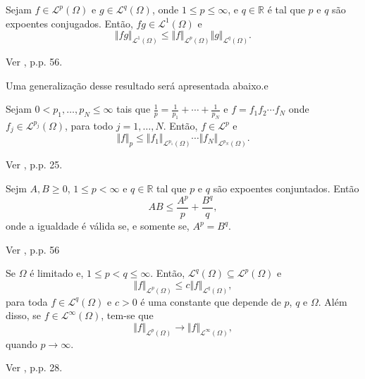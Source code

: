 \documentclass[a4paper, 11pt]{book}
\theoremstyle{definition}
\newcommand{\bR}{\mathbb{R}}
\newcommand{\cL}{\mathcal{L}}
\begin{document}

\begin{tbox} \label{thm:pre-desigualdade-de-holder}
    Sejam $f \in \cL^p(\Omega)$ e $g \in \cL^q(\Omega)$, onde $1 \leqslant p \leqslant \infty$, e $q \in \bR$ é tal que $p$ e $q$ são expoentes conjugados\footnotemark.
    Então, $fg \in \cL^1(\Omega)$ e
    \[
        \Vert fg \Vert_{\cL^1(\Omega)} \leqslant \Vert f \Vert_{\cL^p(\Omega)} \Vert g \Vert_{\cL^q(\Omega)}.
    \]
\end{tbox}
\begin{prf}
    Ver \cite{bartle-measure.theory}, p.p. 56.
\end{prf}


Uma generalização desse resultado será apresentada abaixo.e

\begin{tbox} \label{thm:pre-desigualdade-de-holder-gen}
    Sejam $0 < p_1,\dots,p_N \leqslant \infty$ tais que $\frac{1}{p} = \frac{1}{p_1} + \cdots + \frac{1}{p_N}$ e $f = f_1 f_2 \cdots f_N$ onde $f_j \in \cL^{p_j}(\Omega)$, para todo $j = 1,\dots,N$. 
    Então, $f \in \cL^p$ e 
    \[
        \Vert f \Vert_p \leqslant \Vert f_1 \Vert_{\cL^{p_1}(\Omega)} \cdots \Vert f_N \Vert_{\cL^{p_N}(\Omega)}.
    \] 
\end{tbox}
\begin{prf}
    Ver \cite{adams-sobolev}, p.p. 25.
\end{prf}

\begin{tbox} \label{thm:desigualdade-de-young}
    Sejm $A,B \geqslant 0$, $1 \leqslant p < \infty$ e $q \in \bR$ tal que $p$ e $q$ são expoentes conjuntados. Então
    \[
        AB \leqslant \frac{A^p}{p} + \frac{B^q}{q},
    \]
    onde a igualdade é válida se, e somente se, $A^p = B^q$.
\end{tbox}
\begin{prf}
    Ver \cite{bartle-measure.theory}, p.p. 56
\end{prf}

\begin{tbox} \label{thm:omega-limitado}
    Se $\Omega$ é limitado e, $1 \leqslant p < q \leqslant \infty$.
    Então, $\cL^q(\Omega) \subseteq \cL^p(\Omega)$ e 
    \[
        \Vert f \Vert_{\cL^p(\Omega)} \leqslant c \Vert f \Vert_{\cL^q(\Omega)},
    \]
    para toda $f \in \cL^q(\Omega)$ e $c > 0$ é uma constante que depende de $p$, $q$ e $\Omega$.
    Além disso, se $f \in \cL^\infty(\Omega)$, tem-se que
    \[
        \Vert f \Vert_{\cL^p(\Omega)} \to \Vert f  \Vert_{\cL^\infty(\Omega)},
    \]
    quando $p \to \infty$.
\end{tbox}
\begin{prf}
    Ver \cite{adams-sobolev}, p.p. 28.
\end{prf}
\end{document}
